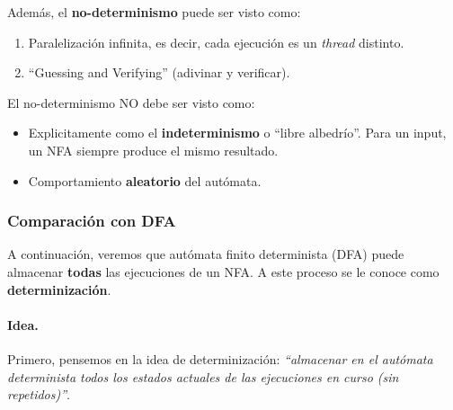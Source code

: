 Además, el \textbf{no-determinismo} puede ser visto como:
\begin{enumerate}
    \item Paralelización infinita, es decir, cada ejecución es un \textit{thread} distinto.
    \item ``Guessing and Verifying'' (adivinar y verificar).
\end{enumerate}

El no-determinismo NO debe ser visto como:
\begin{itemize}
    \item Explicitamente como el \textbf{indeterminismo} o ``libre albedrío''. Para un input, un NFA siempre produce el mismo resultado.
    \item Comportamiento \textbf{aleatorio} del autómata.
\end{itemize}


\subsubsection{Comparación con DFA}

A continuación, veremos que autómata finito determinista (DFA) puede almacenar \textbf{todas} las ejecuciones de un NFA. A este proceso se le conoce como \textbf{determinización}.


\paragraph{Idea.} Primero, pensemos en la idea de determinización: \textit{``almacenar en el autómata determinista todos los estados actuales de las ejecuciones en curso (sin repetidos)''}.


